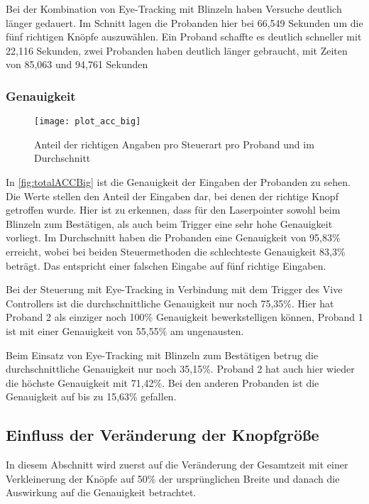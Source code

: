 Bei der Kombination von Eye-Tracking mit Blinzeln haben Versuche deutlich länger gedauert. Im Schnitt lagen die Probanden hier bei 66,549 Sekunden um die fünf richtigen Knöpfe auszuwählen. Ein Proband schaffte es deutlich schneller mit 22,116 Sekunden, zwei Probanden haben deutlich länger gebraucht, mit Zeiten von 85,063 und 94,761 Sekunden

\subsubsection{Genauigkeit}

\begin{figure}[!htbp]
	\centering
	\texttt{[image: plot\_acc\_big]}
	\caption[Anteil der richtigen Angaben pro Steuerart pro Proband und im Durchschnitt]{Anteil der richtigen Angaben pro Steuerart pro Proband und im Durchschnitt}
	\label{fig:totalACCBig}
\end{figure}
In \autoref{fig:totalACCBig} ist die Genauigkeit der Eingaben der Probanden zu sehen. Die Werte stellen den Anteil der Eingaben dar, bei denen der richtige Knopf getroffen wurde. Hier ist zu erkennen, dass  für den Laserpointer sowohl beim Blinzeln zum Bestätigen, als auch beim Trigger eine sehr hohe Genauigkeit vorliegt. Im Durchschnitt haben die Probanden eine Genauigkeit von 95,83\% erreicht, wobei bei beiden Steuermethoden die schlechteste Genauigkeit 83,3\% beträgt. Das entspricht einer falschen Eingabe auf fünf richtige Eingaben.

Bei der Steuerung mit Eye-Tracking in Verbindung mit dem Trigger des Vive Controllers ist die durchschnittliche Genauigkeit nur noch 75,35\%. Hier hat Proband 2 als einziger noch 100\% Genauigkeit bewerkstelligen können, Proband 1 ist mit einer Genauigkeit von 55,55\% am ungenausten. 

Beim Einsatz von Eye-Tracking mit Blinzeln zum Bestätigen betrug die durchschnittliche Genauigkeit nur noch 35,15\%. Proband 2 hat auch hier wieder die höchste Genauigkeit mit 71,42\%. Bei den anderen Probanden ist die Genauigkeit auf bis zu 15,63\% gefallen. 



\subsection{Einfluss der Veränderung der Knopfgröße}
In diesem Abschnitt wird zuerst auf die Veränderung der Gesamtzeit mit einer Verkleinerung der Knöpfe auf 50\% der ursprünglichen Breite und danach die Auswirkung auf die Genauigkeit betrachtet. 
